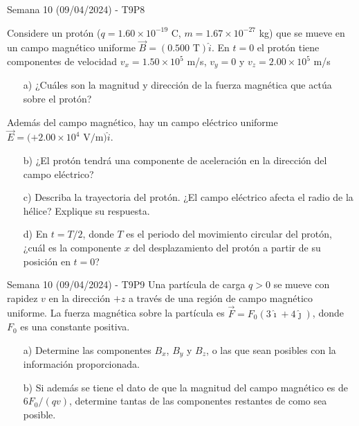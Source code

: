 \begin{frame}{Semana 10 (09/04/2024) - T9P8}
    
     Considere un protón ($q=1.60\times10^{-19}$ C, $m= 1.67\times 10^{-27}$ kg) que se mueve en un campo magnético uniforme $\vec{B}=(0.500\text{ T})\hat{i}$. En $t=0$ el protón tiene componentes de velocidad $v_x=1.50\times10^5$ m/s, $v_y=0$ y $v_z=2.00\times10^5$ m/s

\begin{itemize}
    \item[a)] ¿Cuáles son la magnitud y dirección de la fuerza magnética que actúa sobre el protón? 
    
    \end{itemize}
    
    Además del campo magnético, hay un campo eléctrico uniforme $\vec{E}=(+2.00\times 10^4\text{ V/m)}\hat{i}$.
    
    \begin{itemize}
    \item[b)] ¿El protón tendrá una componente de aceleración en la dirección del campo el\'ectrico?
    \item[c)] Describa la trayectoria del prot\'on. ¿El campo el\'ectrico afecta el radio de la hélice? Explique su respuesta.
    
    \item[d)] En $t=T/2$, donde $T$ es el periodo del movimiento circular del protón, ¿cuál es la componente $x$ del desplazamiento del protón a partir de su posición en $t=0$?

\end{itemize}

    
\end{frame}

\begin{frame}{Semana 10 (09/04/2024) - T9P9}
    Una partícula de carga $q>0$ se mueve con rapidez $v$ en la
dirección $+z$ a través de una región de campo magnético uniforme.
La fuerza magnética sobre la partícula es $\vec{F}=F_0(3\hat{\imath}+4\hat{\jmath})$, donde $F_0$
es una constante positiva.
\begin{itemize}
    \item[a)] Determine las componentes $B_x$, $B_y$ y $B_z$,
o las que sean posibles con la información proporcionada.
    \item[b)] Si además se tiene el dato de que la magnitud del campo magnético es de
$6F_0/(qv)$, determine tantas de las componentes restantes de como sea
posible.
\end{itemize}
\end{frame}

